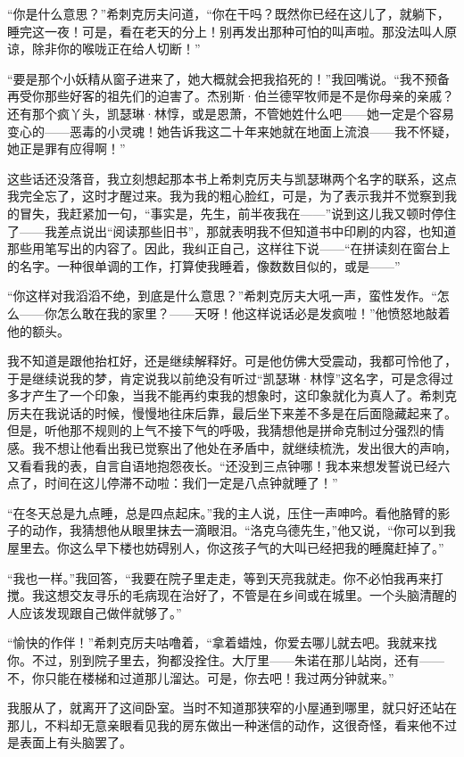 \par “你是什么意思？”希刺克厉夫问道，“你在干吗？既然你已经在这儿了，就躺下，睡完这一夜！可是，看在老天的分上！别再发出那种可怕的叫声啦。那没法叫人原谅，除非你的喉咙正在给人切断！”
\par “要是那个小妖精从窗子进来了，她大概就会把我掐死的！”我回嘴说。“我不预备再受你那些好客的祖先们的迫害了。杰别斯·伯兰德罕牧师是不是你母亲的亲戚？还有那个疯丫头，凯瑟琳·林惇，或是恩萧，不管她姓什么吧——她一定是个容易变心的——恶毒的小灵魂！她告诉我这二十年来她就在地面上流浪——我不怀疑，她正是罪有应得啊！”
\par 这些话还没落音，我立刻想起那本书上希刺克厉夫与凯瑟琳两个名字的联系，这点我完全忘了，这时才醒过来。我为我的粗心脸红，可是，为了表示我并不觉察到我的冒失，我赶紧加一句，“事实是，先生，前半夜我在——”说到这儿我又顿时停住了——我差点说出“阅读那些旧书”，那就表明我不但知道书中印刷的内容，也知道那些用笔写出的内容了。因此，我纠正自己，这样往下说——“在拼读刻在窗台上的名字。一种很单调的工作，打算使我睡着，像数数目似的，或是——”
\par “你这样对我滔滔不绝，到底是什么意思？”希刺克厉夫大吼一声，蛮性发作。“怎么——你怎么敢在我的家里？——天呀！他这样说话必是发疯啦！”他愤怒地敲着他的额头。
\par 我不知道是跟他抬杠好，还是继续解释好。可是他仿佛大受震动，我都可怜他了，于是继续说我的梦，肯定说我以前绝没有听过“凯瑟琳·林惇”这名字，可是念得过多才产生了一个印象，当我不能再约束我的想象时，这印象就化为真人了。希刺克厉夫在我说话的时候，慢慢地往床后靠，最后坐下来差不多是在后面隐藏起来了。但是，听他那不规则的上气不接下气的呼吸，我猜想他是拼命克制过分强烈的情感。我不想让他看出我已觉察出了他处在矛盾中，就继续梳洗，发出很大的声响，又看看我的表，自言自语地抱怨夜长。“还没到三点钟哪！我本来想发誓说已经六点了，时间在这儿停滞不动啦：我们一定是八点钟就睡了！”
\par “在冬天总是九点睡，总是四点起床。”我的主人说，压住一声呻吟。看他胳臂的影子的动作，我猜想他从眼里抹去一滴眼泪。“洛克乌德先生，”他又说，“你可以到我屋里去。你这么早下楼也妨碍别人，你这孩子气的大叫已经把我的睡魔赶掉了。”
\par “我也一样。”我回答，“我要在院子里走走，等到天亮我就走。你不必怕我再来打搅。我这想交友寻乐的毛病现在治好了，不管是在乡间或在城里。一个头脑清醒的人应该发现跟自己做伴就够了。”
\par “愉快的作伴！”希刺克厉夫咕噜着，“拿着蜡烛，你爱去哪儿就去吧。我就来找你。不过，别到院子里去，狗都没拴住。大厅里——朱诺在那儿站岗，还有——不，你只能在楼梯和过道那儿溜达。可是，你去吧！我过两分钟就来。”
\par 我服从了，就离开了这间卧室。当时不知道那狭窄的小屋通到哪里，就只好还站在那儿，不料却无意亲眼看见我的房东做出一种迷信的动作，这很奇怪，看来他不过是表面上有头脑罢了。
